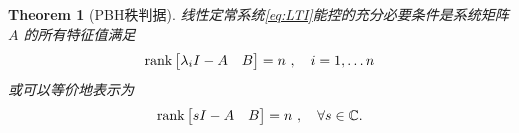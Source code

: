 \documentclass[14pt,a4paper]{article}
\theoremstyle{plain}
\newtheorem{thm}{Theorem}[section]
\theoremstyle{definition}
\theoremstyle{remark}
\theoremstyle{plain}
\theoremstyle{plain}
\theoremstyle{plain}
\theoremstyle{definition}
\theoremstyle{remark}
\numberwithin{equation}{section}
\begin{document}
				\begin{thm}[PBH秩判据]  
				\label{the:pbh秩判据}
				线性定常系统\eqref{eq:LTI}能控的\emph{充分必要}条件是系统矩阵$A$ 的所有特征值满足
				\begin{equation}
				\label{eq:PBH}
					\mathop{\textnormal{rank}} \begin{bmatrix}
						\lambda_{i}I - A & B 
					\end{bmatrix} = n \ ,\quad i=1,\ldots n
				\end{equation} 
				或可以等价地表示为
				\begin{equation}
				\label{eq:PBH_2}
					\mathop{\textnormal{rank}} \begin{bmatrix}
						sI - A & B 
					\end{bmatrix} = n \ , \quad \forall s\in \mathbb{C}
				.\end{equation}		
				\end{thm} 
\end{document}

